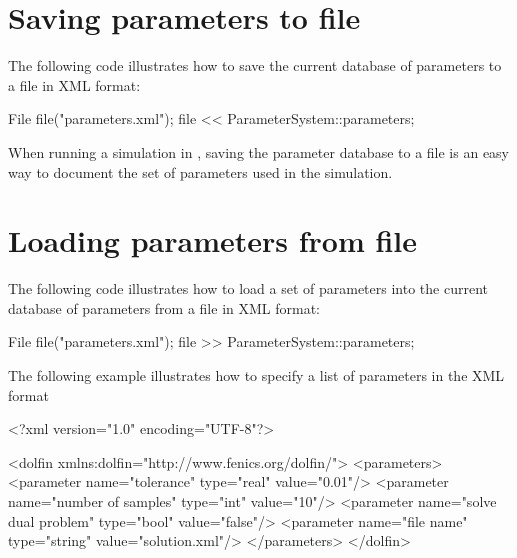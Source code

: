 \section{Saving parameters to file}

The following code illustrates how to save the current database of
parameters to a file in \dolfin{} XML format:
\begin{code}
File file("parameters.xml");
file << ParameterSystem::parameters;
\end{code}
When running a simulation in \dolfin{}, saving the parameter database
to a file is an easy way to document the set of parameters used in the
simulation.

\section{Loading parameters from file}

The following code illustrates how to load a set of parameters into
the current database of parameters from a file in \dolfin{} XML format:
\begin{code}
File file("parameters.xml");
file >> ParameterSystem::parameters;
\end{code}
The following example illustrates how to specify a list of parameters
in the \dolfin{} XML format
\footnotesize
\begin{code}
<?xml version="1.0" encoding="UTF-8"?> 

<dolfin xmlns:dolfin="http://www.fenics.org/dolfin/"> 
  <parameters>
    <parameter name="tolerance" type="real" value="0.01"/>
    <parameter name="number of samples" type="int" value="10"/>
    <parameter name="solve dual problem" type="bool" value="false"/>
    <parameter name="file name" type="string" value="solution.xml"/>
  </parameters>
</dolfin>
\end{code}
\normalsize
